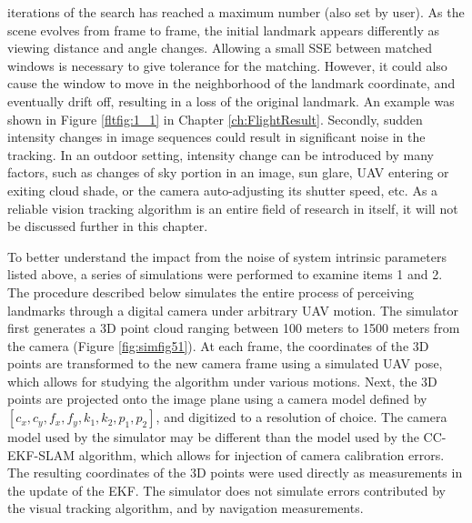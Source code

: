 \begin{enumerate}
  iterations of the search has reached a maximum number (also set by
  user). As the scene evolves from frame to frame, the initial
  landmark appears differently as viewing distance and angle changes.
  Allowing a small SSE between matched windows is necessary to give
  tolerance for the matching. However, it could also cause the window
  to move in the neighborhood of the landmark coordinate, and
  eventually drift off, resulting in a loss of the original landmark.
  An example was shown in Figure \ref{fltfig:1_1} in Chapter
  \ref{ch:FlightResult}. Secondly, sudden intensity changes in image
  sequences could result in significant noise in the tracking. In an
  outdoor setting, intensity change can be introduced by many factors,
  such as changes of sky portion in an image, sun glare, UAV entering
  or exiting cloud shade, or the camera auto-adjusting its shutter
  speed, etc. As a reliable vision tracking algorithm is an entire
  field of research in itself, it will not be discussed further in
  this chapter.

\end{enumerate}

To better understand the impact from the noise of system intrinsic
parameters listed above, a series of simulations were performed to
examine items 1 and 2. The procedure described below simulates the
entire process of perceiving landmarks through a digital camera under
arbitrary UAV motion. The simulator first generates a 3D point cloud
ranging between 100 meters to 1500 meters from the camera (Figure
\ref{fig:simfig51}). At each frame, the coordinates of the 3D points
are transformed to the new camera frame using a simulated UAV pose,
which allows for studying the algorithm under various motions. Next,
the 3D points are projected onto the image plane using a camera model
defined by $[c_{x}, c_{y}, f_{x}, f_{y}, k_{1}, k_{2}, p_{1}, p_{2}]$,
and digitized to a resolution of choice. The camera model used by the
simulator may be different than the model used by the CC-EKF-SLAM
algorithm, which allows for injection of camera calibration errors.
The resulting coordinates of the 3D points were used directly as
measurements in the update of the EKF. The simulator does not simulate 
errors contributed by the visual tracking algorithm, and by navigation
measurements.

